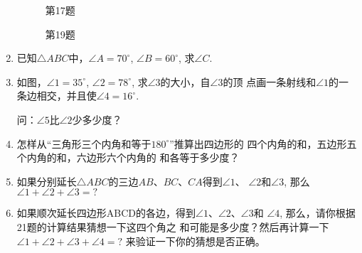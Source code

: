 \begin{enumerate}
\begin{figure}[htp]\centering
    \begin{minipage}[t]{0.48\textwidth}
    \centering
{}
    \caption*{第17题}
    \end{minipage}
    \begin{minipage}[t]{0.48\textwidth}
    \centering
    \caption*{第19题}
    \end{minipage}
    \end{figure}

\item 已知$\triangle ABC$中，$\angle A=70^{\circ}$, $\angle B=60^{\circ}$, 求$\angle C$.
\item 如图，$\angle 1=35^{\circ}$, $\angle 2=78^{\circ}$, 求$\angle 3$的大小，自$\angle 3$的顶
点画一条射线和$\angle 1$的一条边相交，并且使$\angle 4=16^{\circ}$.

问：$\angle 5$比$\angle 2$少多少度？

\item 怎样从“三角形三个内角和等于$180^{\circ}$”推算出四边形的
四个内角的和，五边形五个内角的和，六边形六个内角的
和各等于多少度？
\item 如果分别延长$\triangle ABC$的三边$AB$、$BC$、$CA$得到$\angle 1$、
$\angle 2$和$\angle 3$, 那么$\angle 1+\angle 2+\angle 3=?$
\item 如果顺次延长四边形ABCD的各边，得到$\angle 1$、$\angle 2$、$\angle 3$和
$\angle 4$, 那么，请你根据21题的计算结果猜想一下这四个角之
和可能是多少度？然后再计算一下$\angle 1+\angle 2+\angle 3+\angle 4=?$
来验证一下你的猜想是否正确。


\end{enumerate}

